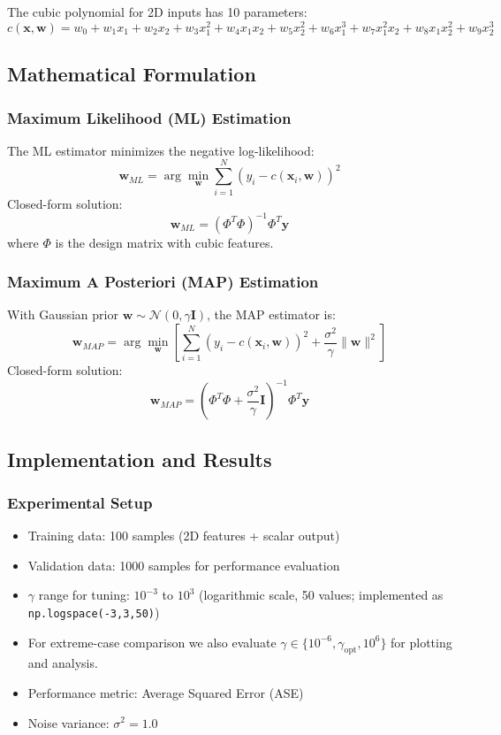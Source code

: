 \documentclass[12pt]{article}
\begin{document}
The cubic polynomial for 2D inputs has 10 parameters:
\[
c(\mathbf{x},\mathbf{w}) = w_0 + w_1x_1 + w_2x_2 + w_3x_1^2 + w_4x_1x_2 + w_5x_2^2 + w_6x_1^3 + w_7x_1^2x_2 + w_8x_1x_2^2 + w_9x_2^3
\]

\subsection{Mathematical Formulation}

\subsubsection{Maximum Likelihood (ML) Estimation}
The ML estimator minimizes the negative log-likelihood:
\[
\mathbf{w}_{ML} = \arg\min_{\mathbf{w}} \sum_{i=1}^N (y_i - c(\mathbf{x}_i,\mathbf{w}))^2
\]
Closed-form solution:
\[
\mathbf{w}_{ML} = (\Phi^T\Phi)^{-1}\Phi^T\mathbf{y}
\]
where $\Phi$ is the design matrix with cubic features.

\subsubsection{Maximum A Posteriori (MAP) Estimation}
With Gaussian prior $\mathbf{w} \sim \mathcal{N}(0, \gamma\mathbf{I})$, the MAP estimator is:
\[
\mathbf{w}_{MAP} = \arg\min_{\mathbf{w}} \left[ \sum_{i=1}^N (y_i - c(\mathbf{x}_i,\mathbf{w}))^2 + \frac{\sigma^2}{\gamma}\|\mathbf{w}\|^2 \right]
\]
Closed-form solution:
\[
\mathbf{w}_{MAP} = (\Phi^T\Phi + \frac{\sigma^2}{\gamma}\mathbf{I})^{-1}\Phi^T\mathbf{y}
\]

\subsection{Implementation and Results}

\subsubsection{Experimental Setup}
\begin{itemize}
    \item Training data: 100 samples (2D features + scalar output)
    \item Validation data: 1000 samples for performance evaluation
    \item $\gamma$ range for tuning: $10^{-3}$ to $10^{3}$ (logarithmic scale, 50 values; implemented as \texttt{np.logspace(-3,3,50)})
    \item For extreme-case comparison we also evaluate $\gamma\in\{10^{-6}, \gamma_{\mathrm{opt}}, 10^{6}\}$ for plotting and analysis.
    \item Performance metric: Average Squared Error (ASE)
    \item Noise variance: $\sigma^2 = 1.0$
\end{itemize}
\end{document}
